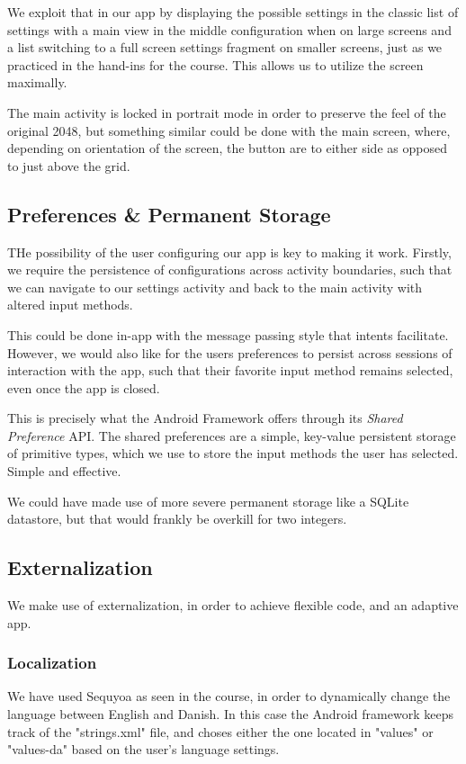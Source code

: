 \documentclass[a4paper, 12pt]{article}
\begin{document}
We exploit that in our app by displaying the possible settings in the
classic list of settings with a main view in the middle configuration
when on large screens and a list switching to a full screen settings
fragment on smaller screens, just as we practiced in the hand-ins for
the course. This allows us to utilize the screen maximally.

The main activity is locked in portrait mode in order to preserve the
feel of the original 2048, but something similar could be done with
the main screen, where, depending on orientation of the screen, the
button are to either side as opposed to just above the grid.

\subsection{Preferences \& Permanent Storage}
THe possibility of the user configuring our app is key to making it
work. Firstly, we require the persistence of configurations across
activity boundaries, such that we can navigate to our settings
activity and back to the main activity with altered input methods.

This could be done in-app with the message passing style that intents
facilitate. However, we would also like for the users preferences to
persist across sessions of interaction with the app, such that their
favorite input method remains selected, even once the app is closed.

This is precisely what the Android Framework offers through its
\emph{Shared Preference} API. The shared preferences are a simple,
key-value persistent storage of primitive types, which we use to store
the input methods the user has selected. Simple and effective.

We could have made use of more severe permanent storage like a SQLite
datastore, but that would frankly be overkill for two integers.

\subsection{Externalization}
We make use of externalization, in order to achieve flexible code, and an adaptive app. 

\subsubsection{Localization}
We have used Sequyoa as seen in the course, in order to dynamically change the language between English and Danish. In this case the Android framework keeps track of the "strings.xml" file, and choses either the one located in "values" or "values-da" based on the user's language settings.
\end{document}
